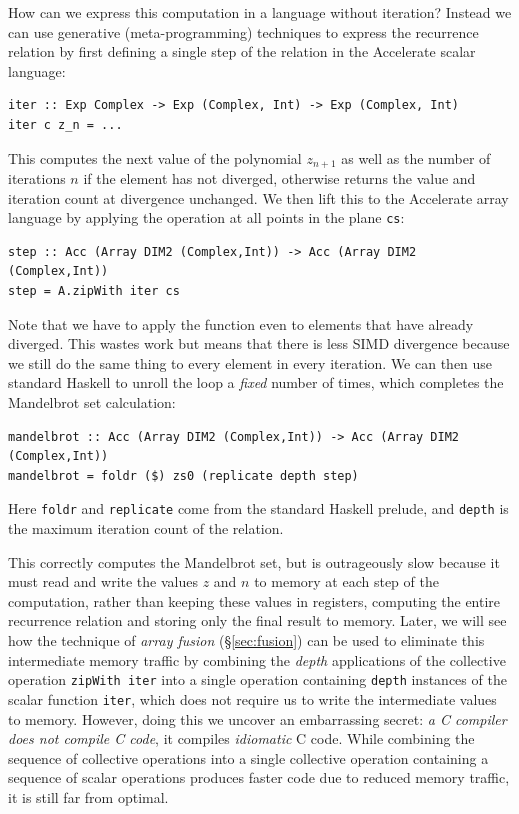 How can we express this computation in a language without iteration? Instead we
can use generative (meta-programming) techniques to express the recurrence
relation by first defining a single step of the relation in the Accelerate
scalar language:
%
\begin{lstlisting}[style=haskell]
iter :: Exp Complex -> Exp (Complex, Int) -> Exp (Complex, Int)
iter c z_n = ...
\end{lstlisting}
%
%
This computes the next value of the polynomial $z_{n+1}$ as well as the number
of iterations $n$ if the element has not diverged, otherwise returns the value
and iteration count at divergence unchanged. We then lift this to the Accelerate
array language by applying the operation at all points in the plane \texttt{cs}:
%
\begin{lstlisting}[style=haskell,firstnumber=last]
step :: Acc (Array DIM2 (Complex,Int)) -> Acc (Array DIM2 (Complex,Int))
step = A.zipWith iter cs
\end{lstlisting}
%
Note that we have to apply the function even to elements that have already
diverged. This wastes work but means that there is less SIMD divergence because
we still do the same thing to every element in every iteration. We can then use
standard Haskell to unroll the loop a \emph{fixed} number of times, which
completes the Mandelbrot set calculation:
%
\begin{lstlisting}[style=haskell,firstnumber=last]
mandelbrot :: Acc (Array DIM2 (Complex,Int)) -> Acc (Array DIM2 (Complex,Int))
mandelbrot = foldr ($) zs0 (replicate depth step)
\end{lstlisting}
%
Here \texttt{foldr} and \texttt{replicate} come from the standard Haskell
prelude, and \texttt{depth} is the maximum iteration count of the relation.

This correctly computes the Mandelbrot set, but is outrageously slow because it
must read and write the values $z$ and $n$ to memory at each step of the
computation, rather than keeping these values in registers, computing the entire
recurrence relation and storing only the final result to memory. Later, we will
see how the technique of \emph{array fusion} (\S\ref{sec:fusion}) can be used to
eliminate this intermediate memory traffic by combining the \emph{depth}
applications of the collective operation \texttt{zipWith iter} into a single
operation containing \texttt{depth} instances of the scalar function
\texttt{iter}, which does not require us to write the intermediate values to
memory. However, doing this we uncover an embarrassing secret: \emph{a C
compiler does not compile C code}, it compiles \emph{idiomatic} C code. While
combining the sequence of collective operations into a single collective
operation containing a sequence of scalar operations produces faster code due to
reduced memory traffic, it is still far from optimal.

